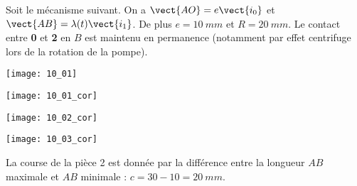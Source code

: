 \normalfalse \difficiletrue \tdifficilefalse
\correctiontrue


\setcounter{question}{0}%
\ifcorrection
\else
{}
\fi

\ifprof
\else
Soit le mécanisme suivant. On a $\vect{AO}=e\vect{i_0}$ et $\vect{AB}=\lambda(t)\vect{i_1}$. De plus $e=\SI{10}{mm}$ et $R=\SI{20}{mm}$. Le contact entre \textbf{0} et \textbf{2} en $B$ est maintenu en permanence (notamment par effet centrifuge lors de la rotation de la pompe).
\begin{marginfigure}
\texttt{[image: 10\_01]}
\end{marginfigure}
\fi


\ifprof
\begin{marginfigure}
\texttt{[image: 10\_01\_cor]}
\end{marginfigure}
\else
\fi


\ifprof
\begin{marginfigure}
\texttt{[image: 10\_02\_cor]}
\end{marginfigure}
\else
\fi

\ifprof
\begin{marginfigure}
\texttt{[image: 10\_03\_cor]}
\end{marginfigure}

\else
\fi


\ifprof
La course de la pièce 2 est donnée par la différence entre la longueur $AB$ maximale et $AB$ minimale : $c= 30-10 = \SI{20}{mm}$.
\else
\fi



\ifprof
\else


\fi